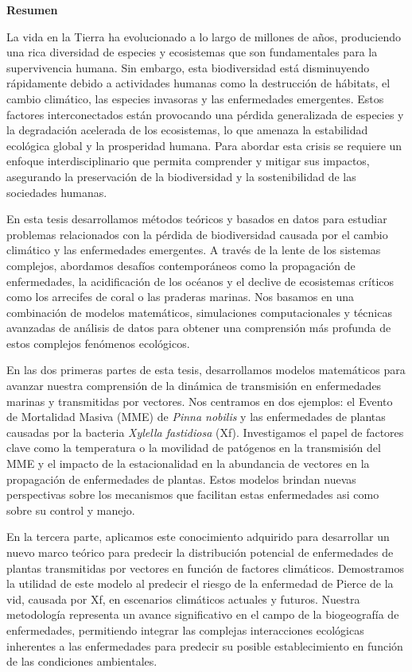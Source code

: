 \begin{center}
    \textbf{\Large Resumen}
\end{center}

La vida en la Tierra ha evolucionado a lo largo de millones de años,
produciendo una rica diversidad de especies y ecosistemas que
son fundamentales para la supervivencia humana. Sin embargo, esta biodiversidad
está disminuyendo rápidamente debido a actividades humanas como la destrucción
de hábitats, el cambio climático, las especies invasoras y las enfermedades
emergentes. Estos factores interconectados están provocando una pérdida
generalizada de especies y la degradación acelerada de los ecosistemas, lo que
amenaza la estabilidad ecológica global y la prosperidad humana. Para abordar
esta crisis se requiere un enfoque interdisciplinario que permita comprender y
mitigar sus impactos, asegurando la preservación de la biodiversidad y la
sostenibilidad de las sociedades humanas.

En esta tesis desarrollamos métodos teóricos y basados en datos para estudiar
problemas relacionados con la pérdida de biodiversidad causada por el cambio
climático y las enfermedades emergentes. A través de la lente de los sistemas
complejos, abordamos desafíos contemporáneos como la propagación de
enfermedades, la acidificación de los océanos y el declive de ecosistemas
críticos como los arrecifes de coral o las praderas marinas. Nos basamos en una
combinación de modelos matemáticos, simulaciones computacionales y técnicas
avanzadas de análisis de datos para obtener una comprensión más profunda de
estos complejos fenómenos ecológicos.

En las dos primeras partes de esta tesis, desarrollamos modelos matemáticos
para avanzar nuestra comprensión de la dinámica de transmisión en enfermedades
marinas y transmitidas por vectores. Nos centramos en dos ejemplos: el Evento
de Mortalidad Masiva (MME) de \textit{Pinna nobilis} y las enfermedades de
plantas causadas por la bacteria \textit{Xylella fastidiosa} (Xf). Investigamos
el papel de factores clave como la temperatura o la movilidad de patógenos en
la transmisión del MME y el impacto de la estacionalidad en la abundancia de
vectores en la propagación de enfermedades de plantas. Estos modelos brindan
nuevas perspectivas sobre los mecanismos que facilitan estas enfermedades asi
como sobre su control y manejo.

En la tercera parte, aplicamos este conocimiento adquirido para desarrollar un
nuevo marco teórico para predecir la distribución potencial de enfermedades de
plantas transmitidas por vectores en función de factores climáticos.
Demostramos la utilidad de este modelo al predecir el riesgo de la
enfermedad de Pierce de la vid, causada por Xf, en escenarios climáticos
actuales y futuros. Nuestra metodología representa un avance significativo en
el campo de la biogeografía de enfermedades, permitiendo integrar las complejas
interacciones ecológicas inherentes a las enfermedades para predecir su posible
establecimiento en función de las condiciones ambientales.

